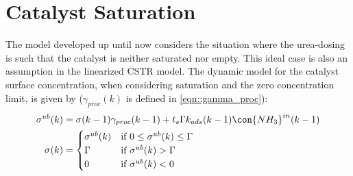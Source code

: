 \section{Catalyst Saturation}

The model developed up until now considers the situation where the urea-dosing is such that the catalyst is neither
saturated nor empty. This ideal case is also an assumption in the linearized CSTR model. The dynamic model for the
catalyst surface concentration, when considering saturation and the zero concentration limit, is given by
($\gamma_{proc}(k)$ is defined in \ref{eqn::gamma_proc}):
\begin{align}
        \sigma^{ub}(k) &= \sigma (k-1) \gamma_{proc}(k-1) + t_s \Gamma k_{ads}(k-1) \con{NH_3}^{in}(k-1)
        \label{eqn::unbounded_sigma_mdl}\\
        \sigma(k) &= \begin{cases}
                                \sigma^{ub}(k) & \text{if }  0 \leq \sigma^{ub}(k) \leq \Gamma\\
                                \Gamma         & \text{if }  \sigma^{ub}(k) > \Gamma \\
                                0              & \text{if }  \sigma^{ub}(k) < 0
                        \end{cases}
        \label{eqn::actual_sigma_mdl}
\end{align}


